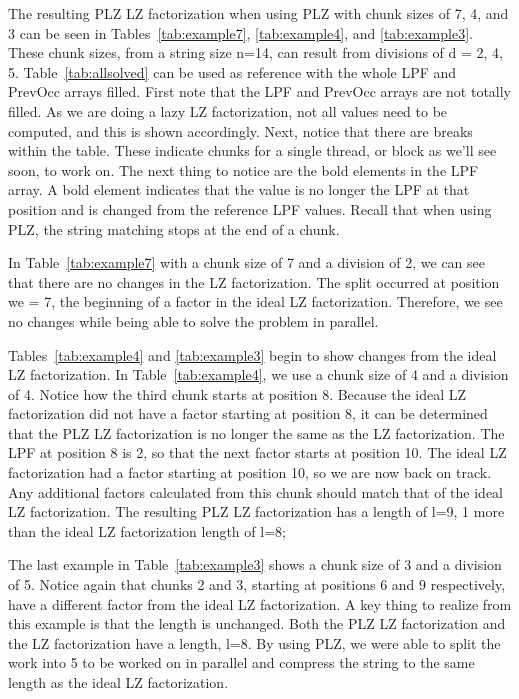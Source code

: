 The resulting PLZ LZ factorization when using PLZ with chunk sizes of 7, 4, and 3 can be seen in Tables~\ref{tab:example7}, \ref{tab:example4}, and \ref{tab:example3}. 
These chunk sizes, from a string size n=14, can result from divisions of d = 2, 4, 5.
Table~\ref{tab:allsolved} can be used as reference with the whole LPF and PrevOcc arrays filled.
First note that the LPF and PrevOcc arrays are not totally filled.
As we are doing a lazy LZ factorization, not all values need to be computed, and this is shown accordingly.
Next, notice that there are breaks within the table.
These indicate chunks for a single thread, or block as we'll see soon, to work on.
The next thing to notice are the bold elements in the LPF array.
A bold element indicates that the value is no longer the LPF at that position and is changed from the reference LPF values.
Recall that when using PLZ, the string matching stops at the end of a chunk.

In Table~\ref{tab:example7} with a chunk size of 7 and a division of 2, we can see that there are no changes in the LZ factorization.
The split occurred at position we = 7, the beginning of a factor in the ideal LZ factorization.
Therefore, we see no changes while being able to solve the problem in parallel.

Tables~\ref{tab:example4} and \ref{tab:example3} begin to show changes from the ideal LZ factorization.
In Table~\ref{tab:example4}, we use a chunk size of 4 and a division of 4.
Notice how the third chunk starts at position 8.
Because the ideal LZ factorization did not have a factor starting at position 8, it can be determined that the PLZ LZ factorization is no longer the same as the LZ factorization.
The LPF at position 8 is 2, so that the next factor starts at position 10.
The ideal LZ factorization had a factor starting at position 10, so we are now back on track.
Any additional factors calculated from this chunk should match that of the ideal LZ factorization.
The resulting PLZ LZ factorization has a length of l=9, 1 more than the ideal LZ factorization length of l=8;

The last example in Table~\ref{tab:example3} shows a chunk size of 3 and a division of 5.
Notice again that chunks 2 and 3, starting at positions 6 and 9 respectively, have a different factor from the ideal LZ factorization.
A key thing to realize from this example is that the length is unchanged.
Both the PLZ LZ factorization and the LZ factorization have a length, l=8.
By using PLZ, we were able to split the work into 5 to be worked on in parallel and compress the string to the same length as the ideal LZ factorization.

